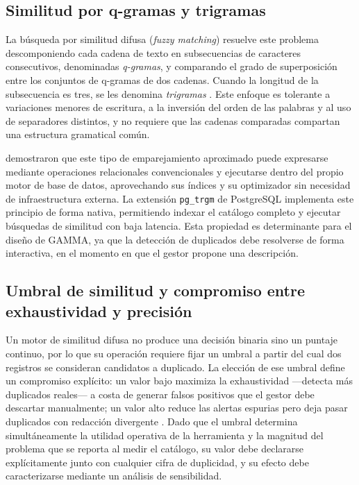 \subsection{Similitud por q-gramas y trigramas}
La búsqueda por similitud difusa (\textit{fuzzy matching}) resuelve este problema descomponiendo cada cadena de texto en subsecuencias de caracteres consecutivos, denominadas \textit{q-gramas}, y comparando el grado de superposición entre los conjuntos de q-gramas de dos cadenas. Cuando la longitud de la subsecuencia es tres, se les denomina \textit{trigramas} \cite{postgresql2026}. Este enfoque es tolerante a variaciones menores de escritura, a la inversión del orden de las palabras y al uso de separadores distintos, y no requiere que las cadenas comparadas compartan una estructura gramatical común.

 demostraron que este tipo de emparejamiento aproximado puede expresarse mediante operaciones relacionales convencionales y ejecutarse dentro del propio motor de base de datos, aprovechando sus índices y su optimizador sin necesidad de infraestructura externa. La extensión \texttt{pg\_trgm} de PostgreSQL \cite{postgresql2026} implementa este principio de forma nativa, permitiendo indexar el catálogo completo y ejecutar búsquedas de similitud con baja latencia. Esta propiedad es determinante para el diseño de GAMMA, ya que la detección de duplicados debe resolverse de forma interactiva, en el momento en que el gestor propone una descripción.

\subsection{Umbral de similitud y compromiso entre exhaustividad y precisión}
Un motor de similitud difusa no produce una decisión binaria sino un puntaje continuo, por lo que su operación requiere fijar un umbral a partir del cual dos registros se consideran candidatos a duplicado. La elección de ese umbral define un compromiso explícito: un valor bajo maximiza la exhaustividad —detecta más duplicados reales— a costa de generar falsos positivos que el gestor debe descartar manualmente; un valor alto reduce las alertas espurias pero deja pasar duplicados con redacción divergente \cite{elmagarmid2007}. Dado que el umbral determina simultáneamente la utilidad operativa de la herramienta y la magnitud del problema que se reporta al medir el catálogo, su valor debe declararse explícitamente junto con cualquier cifra de duplicidad, y su efecto debe caracterizarse mediante un análisis de sensibilidad.

